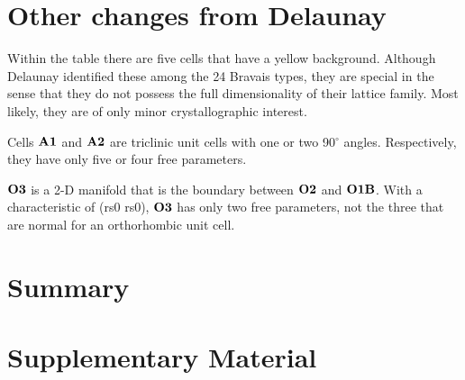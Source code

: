 \documentclass[preprint]{iucr}              %
\numberwithin{equation}{section}
\newcommand{\SVI}[0]{$\bf{S^{6}}$}
\begin{document}
	
\section{Other changes from Delaunay}

	Within the table there are five cells that have a yellow
	background. Although Delaunay identified these among the 24
	Bravais types, they are special in the sense that they
	do not possess the full dimensionality of their lattice
	family. Most likely, they are of only minor crystallographic 
	interest.
	
	Cells $\bf{A1}$ and $\bf{A2}$ are triclinic unit cells with 
	one or two 90$^{\circ}$ angles. Respectively, they have only five
	or four free parameters.
	
	$\bf{O3}$ is a 2-D manifold that is the boundary between
	 $\bf{O2}$ and $\bf{O1B}$.
	With a characteristic of (rs0 rs0), $\bf{O3}$ has only two
	free parameters, not the three that are normal for an 
	orthorhombic unit cell.
	
	


	
	\section{Summary}
	
\section{Supplementary Material}
\end{document}
